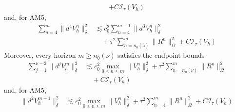 \documentclass[11pt]{article}
\begin{document}
\begin{lem}
\begin{align}
+C\mathcal I_{\tau}(V_h) \label{eq:adams-high-increment-bulk-forcing}
\end{align}
and, for AM5,
\begin{align}
\sum_{n=4}^{m}\|d^4V_h^n\|_{\delta}^2
&\lesssim c_0^2\sum_{n=4}^{m-1}\|d^3V_h^n\|_{\delta}^2 \label{eq:am5-fourth-increment-control-solution}\\
&\quad+\tau^2\sum_{n=n_0(5)}^{m}\|R^n\|_{\Omega}^2
+C\mathcal I_{\tau}(V_h) \label{eq:am5-fourth-increment-control-forcing}
\end{align}
Moreover, every horizon \(m\ge n_0(\nu)\) satisfies the endpoint bounds
\begin{align}
\sum_{j=1}^{\nu-2}\|d^jV_h^m\|_{\delta}^2
&\lesssim c_0^2\max_{0\le n\le m}\|V_h^n\|_{\delta}^2
+\tau^2\sum_{n=n_0(\nu)}^m\|R^n\|_{\Omega}^2 \label{eq:adams-endpoint-increment-solution}\\
&\quad+C\mathcal I_{\tau}(V_h) \label{eq:adams-endpoint-increment-startup}
\end{align}
and, for AM5,
\begin{align}
\|d^2V_h^{m-1}\|_{\delta}^2
&\lesssim c_0^2\max_{0\le n\le m}\|V_h^n\|_{\delta}^2
+\tau^2\sum_{n=4}^m\|R^n\|_{\Omega}^2
+C\mathcal I_{\tau}(V_h) \label{eq:am5-previous-endpoint-increment}
\end{align}
\end{lem}
\end{document}
